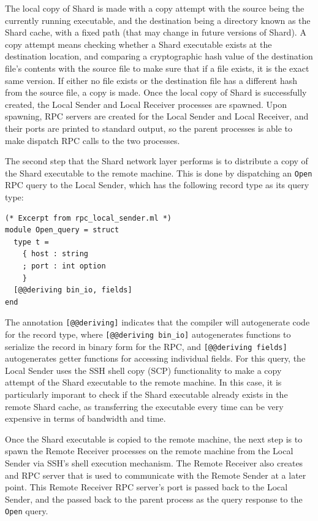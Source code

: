 \documentclass[twoside]{report}
\begin{document}
The local copy of Shard is made with a copy attempt with the source being the currently running executable, and the destination being a directory known as the Shard cache, with a fixed path (that may change in future versions of Shard).
A copy attempt means checking whether a Shard executable exists at the destination location, and comparing a cryptographic hash value of the destination file's contents with the source file to make sure that if a file exists, it is the exact same version.
If either no file exists or the destination file has a different hash from the source file, a copy is made.
Once the local copy of Shard is successfully created, the Local Sender and Local Receiver processes are spawned.
Upon spawning, RPC servers are created for the Local Sender and Local Receiver, and their ports are printed to standard output, so the parent processes is able to make dispatch RPC calls to the two processes.

The second step that the Shard network layer performs is to distribute a copy of the Shard executable to the remote machine.
This is done by dispatching an \texttt{Open} RPC query to the Local Sender, which has the following record type as its query type:

\begin{minipage}[c]{\textwidth-15pt}
  \begin{lstlisting}
(* Excerpt from rpc_local_sender.ml *)
module Open_query = struct
  type t =
    { host : string
    ; port : int option
    }
  [@@deriving bin_io, fields]
end
\end{lstlisting}
  \smallskip
\end{minipage}

The annotation \texttt{[@@deriving]} indicates that the compiler will autogenerate code for the record type, where \texttt{[@@deriving bin\_io]} autogenerates functions to serialize the record in binary form for the RPC, and \texttt{[@@deriving fields]} autogenerates getter functions for accessing individual fields.
For this query, the Local Sender uses the SSH shell copy (SCP) functionality to make a copy attempt of the Shard executable to the remote machine.
In this case, it is particularly imporant to check if the Shard executable already exists in the remote Shard cache, as transferring the executable every time can be very expensive in terms of bandwidth and time.

Once the Shard executable is copied to the remote machine, the next step is to spawn the Remote Receiver processes on the remote machine from the Local Sender via SSH's shell execution mechanism.
The Remote Receiver also creates and RPC server that is used to communicate with the Remote Sender at a later point.
This Remote Receiver RPC server's port is passed back to the Local Sender, and the passed back to the parent process as the query response to the \texttt{Open} query.
\end{document}
